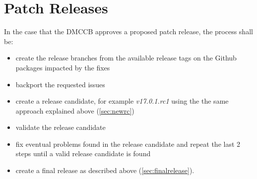 \section{Patch Releases} \label{sec:patchreleases}

In the case that the DMCCB approves a proposed patch release, the process shall be:

\begin{itemize}
\item create the release branches from the available release tags on the Github packages impacted by the fixes
\item backport the requested issues
\item create a release candidate, for example \textit{v17.0.1.rc1} using the the same approach explained above (\ref{sec:newrc})
\item validate the release candidate
\item fix eventual problems found in the release candidate and repeat the last 2 steps until a valid release candidate is found
\item create a final release as described above (\ref{sec:finalrelease}).
\end{itemize}


